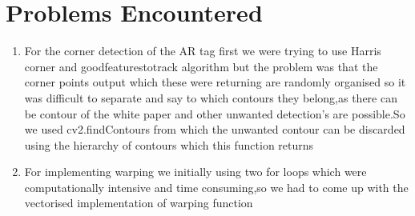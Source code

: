 \documentclass{article}
\begin{document}
\section{Problems Encountered}
\begin{enumerate}
    \item For the corner detection of the AR tag first we were trying to use Harris corner and goodfeaturestotrack algorithm but the problem was that the corner points output which these were returning are randomly organised so it was difficult to separate and say to which contours they belong,as there can be contour of the white paper and other unwanted detection's are possible.So we used cv2.findContours from which the unwanted contour can be discarded using the hierarchy of contours which this function returns
    
    \item For implementing warping we initially using two for loops which were computationally intensive and time consuming,so we had to come up with the vectorised implementation of warping function
 
\end{enumerate}
\end{document}
